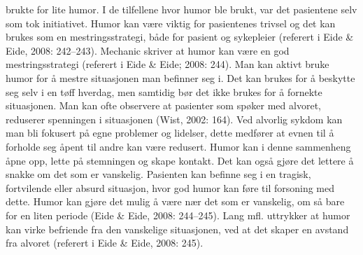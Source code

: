 brukte for lite humor. I de tilfellene hvor humor ble brukt, var det pasientene
selv som tok initiativet.  Humor kan være viktig for pasientenes trivsel og det
kan brukes som en mestringsstrategi, både for pasient og sykepleier (referert i
Eide \&{} Eide, 2008: 242--243).  Mechanic skriver at humor kan være en god
mestringsstrategi (referert i Eide \&{} Eide; 2008: 244). Man kan aktivt bruke
humor for å mestre situasjonen man befinner seg i. Det kan brukes for å
beskytte seg selv i en tøff hverdag, men samtidig bør det ikke brukes for å
fornekte situasjonen. Man kan ofte observere at pasienter som spøker med
alvoret, reduserer spenningen i situasjonen (Wist, 2002: 164).  Ved alvorlig
sykdom kan man bli fokusert på egne problemer og lidelser, dette medfører at
evnen til å forholde seg åpent til andre kan være redusert. Humor kan i denne
sammenheng åpne opp, lette på stemningen og skape kontakt. Det kan også gjøre
det lettere å snakke om det som er vanskelig. Pasienten kan befinne seg i en
tragisk, fortvilende eller absurd situasjon, hvor god humor kan føre til
forsoning med dette. Humor kan gjøre det mulig å være nær det som er vanskelig,
om så bare for en liten periode (Eide \&{} Eide, 2008: 244--245). Lang mfl.
uttrykker at humor kan virke befriende fra den vanskelige situasjonen, ved at
det skaper en avstand fra alvoret (referert i Eide \&{} Eide, 2008: 245).

